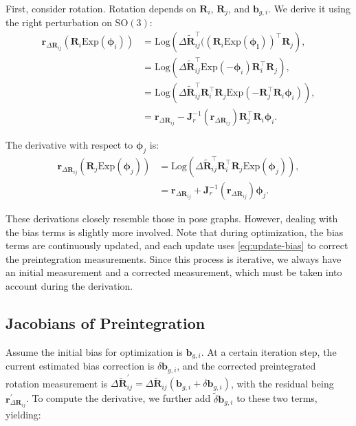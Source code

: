 First, consider rotation. Rotation depends on $\mathbf{R}_{i}$, $\mathbf{R}_j$, and $\mathbf{b}_{g,i}$. We derive it using the right perturbation on $\mathrm{SO}(3)$:  
\begin{equation}\label{key}  
	\begin{aligned}  
		\mathbf{r}_{\Delta \mathbf{R}_{ij}}\left(\mathbf{R}_i \mathrm{Exp} (\boldsymbol{\phi}_i)\right) &=   
		\mathrm{Log} \left( \Delta \tilde{\mathbf{R}}_{ij}^\top ((\mathbf{R}_i   
		\mathrm{Exp}(\boldsymbol{\phi_i}))^\top \mathbf{R}_j \right), \\  
		&= \mathrm{Log} \left( \Delta \tilde{\mathbf{R}}_{ij}^\top \mathrm{Exp} (-\boldsymbol{\phi}_i )   
		\mathbf{R}_i^\top \mathbf{R}_j \right), \\  
		&= \mathrm{Log} \left( \Delta \tilde{\mathbf{R}}_{ij}^\top \mathbf{R}_i^\top \mathbf{R}_j   
		\mathrm{Exp} (-\mathbf{R}_j^\top \mathbf{R}_i \boldsymbol{\phi}_i) \right), \\  
		&= \mathbf{r}_{\Delta \mathbf{R}_{ij}} - \mathbf{J}_r^{-1} (\mathbf{r}_{\Delta \mathbf{R}_{ij}}) \mathbf{R}_j^\top   
		\mathbf{R}_i \boldsymbol{\phi}_i.  
	\end{aligned}  
\end{equation}  

The derivative with respect to $\boldsymbol{\phi}_j$ is:  
\begin{equation}\label{key}  
	\begin{aligned}  
		\mathbf{r}_{\Delta \mathbf{R}_{ij}} (\mathbf{R}_j \mathrm{Exp}(\boldsymbol{\phi}_j)) &=   
		\mathrm{Log}\left(\Delta \tilde{\mathbf{R}}_{ij}^\top \mathbf{R}^\top_i \mathbf{R}_j   
		\mathrm{Exp} (\boldsymbol{\phi}_j ) \right), \\  
		&= \mathbf{r}_{\Delta \mathbf{R}_{ij}} + \mathbf{J}_r^{-1} (\mathbf{r}_{\Delta \mathbf{R}_{ij}}) \boldsymbol{\phi}_j.  
	\end{aligned}  
\end{equation}  

These derivations closely resemble those in pose graphs. However, dealing with the bias terms is slightly more involved. Note that during optimization, the bias terms are continuously updated, and each update uses \eqref{eq:update-bias} to correct the preintegration measurements. Since this process is iterative, we always have an initial measurement and a corrected measurement,  which must be taken into account during the derivation.

\subsection{Jacobians of Preintegration}
\label{sec:preinteg-jacobians}
Assume the initial bias for optimization is $\mathbf{b}_{g,i}$. At a certain iteration step, the current estimated bias correction is $\delta \mathbf{b}_{g,i}$, and the corrected preintegrated rotation measurement is $\Delta \tilde{\mathbf{R}}_{ij}^\prime = \Delta \tilde{\mathbf{R}}_{ij}(\mathbf{b}_{g,i} + \delta \mathbf{b}_{g,i})$, with the residual being $\mathbf{r}_{\Delta \mathbf{R}_{ij}}^\prime$. To compute the derivative, we further add $\tilde{\delta} \mathbf{b}_{g,i}$ to these two terms, yielding:

